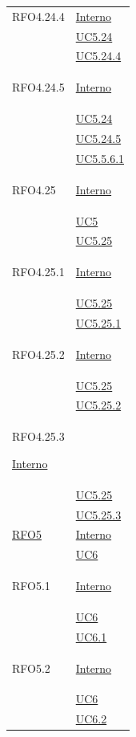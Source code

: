 \begin{longtable}{|>{\centering}m{5cm}|m{5cm}<{\centering}|}
\hypertarget{RFO4.24.4}{RFO4.24.4} &  \hyperlink{Interno}{Interno}\\
&\hyperref[UC5.24]{UC5.24}\\
&\hyperref[UC5.24.4]{UC5.24.4}\\ \hline

\hypertarget{RFO4.24.5}{RFO4.24.5} & \hyperlink{Interno}{Interno}\\
&\hyperref[UC5.24]{UC5.24}\\
&\hyperref[UC5.24.5]{UC5.24.5}\\ 
&\hyperref[UC5.5.6.1]{UC5.5.6.1}\\ \hline

\hypertarget{RFO4.25}{RFO4.25} & \hyperlink{Interno}{Interno}\\
&\hyperref[UC5]{UC5}\\
&\hyperref[UC5.25]{UC5.25}\\ \hline

\hypertarget{RFO4.25.1}{RFO4.25.1} &  \hyperlink{Interno}{Interno}\\
&\hyperref[UC5.25]{UC5.25}\\
&\hyperref[UC5.25.1]{UC5.25.1}\\ \hline

\hypertarget{RFO4.25.2}{RFO4.25.2} & \hyperlink{Interno}{Interno}\\
&\hyperref[UC5.25]{UC5.25}\\
&\hyperref[UC5.25.2]{UC5.25.2}\\ \hline

\hypertarget{RFO4.25.3}{RFO4.25.3}   \hyperlink{Interno}{Interno}\\
&\hyperref[UC5.25]{UC5.25}\\
&\hyperref[UC5.25.3]{UC5.25.3}\\ \hline

\hyperlink{RFO5}{RFO5} & \hyperlink{Interno}{Interno}\\
& \hyperref[UC6]{UC6}\\ \hline

\hypertarget{RFO5.1}{RFO5.1}&  \hyperlink{Interno}{Interno}\\
& \hyperref[UC6]{UC6}\\ 
& \hyperref[UC6.1]{UC6.1}\\ \hline

\hypertarget{RFO5.2}{RFO5.2} &  \hyperlink{Interno}{Interno}\\
& \hyperref[UC6]{UC6}\\ 
& \hyperref[UC6.2]{UC6.2}\\ \hline


\end{longtable}
